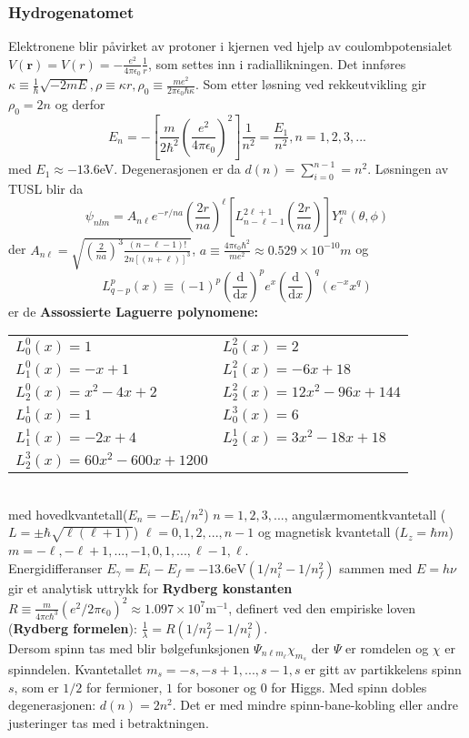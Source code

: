 \documentclass[a4paper, norsk, 8pt]{article}
\begin{document}
\begin{multicols*}{3}
\subsubsection*{\scriptsize Hydrogenatomet} 
Elektronene blir påvirket av protoner i kjernen ved hjelp av coulombpotensialet $V(\mathbf{r})=V(r)=-\frac{e^2}{4\pi\epsilon_0}\frac{1}{r}$, som settes inn i radiallikningen. Det innføres $\kappa\equiv\frac{1}{\hbar}\sqrt{-2mE},\rho\equiv\kappa r, \rho_0\equiv\frac{me^2}{2\pi\epsilon_0\hbar\kappa}$. Som etter løsning ved rekkeutvikling gir $\rho_0=2n$ og derfor
\[E_n=-\left[\frac{m}{2\hbar^2}\left(\frac{e^2}{4\pi \epsilon_0}\right)^2\right]\frac{1}{n^2}=\frac{E_1}{n^2},n=1,2,3,... \]
med $E_1\approx -13.6$eV. Degenerasjonen er da $d(n)=\sum_{i=0}^{n-1}=n^2$. Løsningen av TUSL blir da 
\[ \psi_{nlm}=A_{n\ell}e^{-r/na}\left(\frac{2r}{na}\right)^\ell \left[L_{n-\ell-1}^{2\ell+1}\left(\frac{2r}{na}\right)\right]Y_\ell^m(\theta,\phi) \] der $A_{n\ell}=\sqrt{\left(\frac{2}{na}\right)^3\frac{(n-\ell-1)!}{2n[(n+\ell)]^3}}$, $a\equiv\frac{4\pi\epsilon_0\hbar^2}{me^2}\approx 0.529 \times 10^{-10}m$ og \[L_{q-p}^{p}(x)\equiv (-1)^p\left(\frac{\mbox{d}}{\mbox{d}x}\right)^p e^x \left(\frac{\mbox{d}}{\mbox{d}x}\right)^q (e^{-x}x^q)\] er de
\textbf{Assossierte Laguerre polynomene:}\\
\begin{tabular}{|l|l|}
\hline
$L_0^0(x)=1$				& 
$L_0^2(x)=2$ 				\\ 
$L_1^0(x)=-x+1$  			&
$L_1^2(x)=-6x+18$			\\ 
$L_2^0(x)=x^2-4x+2$ 		& 
$L_2^2(x)=12x^2-96x+144$  	\\
$L_0^1(x)=1$				& 
$L_0^3(x)=6$ 				\\ 
$L_1^1(x)=-2x+4$  			&
$L_2^1(x)=3x^2-18x+18$		\\ 
$L_2^3(x)=60x^2-600x+1200$ & \\ \hline
\end{tabular} \\
med hovedkvantetall($E_n=-E_1/n^2$) $n=1,2,3,...$, angulærmomentkvantetall ($L=\pm \hbar\sqrt{\ell(\ell+1)}$) $\ell=0,1,2,...,n-1$ og magnetisk kvantetall ($L_z=\hbar m$) $m=-\ell,-\ell+1,...,-1,0,1,...,\ell-1,\ell$. \\
Energidifferanser $E_\gamma=E_i-E_f=-13.6\mbox{eV}(1/n_i^2-1/n_f^2)$ sammen med $E=h\nu$ gir et analytisk uttrykk for \textbf{Rydberg konstanten} $R\equiv \frac{m}{4\pi c\hbar^3}(e^2/2\pi\epsilon_0)^2\approx 1.097 \times 10^7\mbox{m}^{-1}$, definert ved den empiriske loven (\textbf{Rydberg formelen}): $\frac{1}{\lambda}=R(1/n_f^2-1/n_i^2)$.\\
Dersom spinn tas med blir bølgefunksjonen $\Psi_{n\ell m_\ell} \chi_{m_s}$ der $\Psi$ er romdelen og $\chi$ er spinndelen. Kvantetallet $m_s = -s,-s+1,...,s-1,s$ er gitt av partikkelens spinn $s$, som er $1/2$ for fermioner, $1$ for bosoner og $0$ for Higgs. Med spinn dobles degenerasjonen: $d(n)=2n^2$. Det er med mindre spinn-bane-kobling eller andre justeringer tas med i betraktningen.


\end{multicols*}
\end{document}
